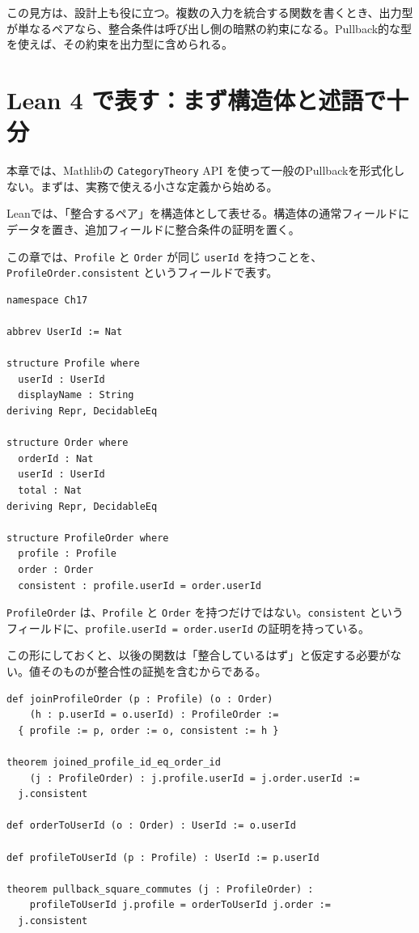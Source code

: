 この見方は、設計上も役に立つ。複数の入力を統合する関数を書くとき、出力型が単なるペアなら、整合条件は呼び出し側の暗黙の約束になる。Pullback的な型を使えば、その約束を出力型に含められる。

\section{Lean 4 で表す：まず構造体と述語で十分}

本章では、Mathlibの \texttt{CategoryTheory} API を使って一般のPullbackを形式化しない。まずは、実務で使える小さな定義から始める。

\begin{leanbox}
Leanでは、「整合するペア」を構造体として表せる。構造体の通常フィールドにデータを置き、追加フィールドに整合条件の証明を置く。

この章では、\texttt{Profile} と \texttt{Order} が同じ \texttt{userId} を持つことを、\texttt{ProfileOrder.consistent} というフィールドで表す。
\end{leanbox}

\begin{listing}[htbp]
\begin{verbatim}
namespace Ch17

abbrev UserId := Nat

structure Profile where
  userId : UserId
  displayName : String
deriving Repr, DecidableEq

structure Order where
  orderId : Nat
  userId : UserId
  total : Nat
deriving Repr, DecidableEq

structure ProfileOrder where
  profile : Profile
  order : Order
  consistent : profile.userId = order.userId
\end{verbatim}
\caption{プロフィール、注文、整合するペア}
\label{lst:ch17-profile-order}
\end{listing}

\texttt{ProfileOrder} は、\texttt{Profile} と \texttt{Order} を持つだけではない。\texttt{consistent} というフィールドに、\texttt{profile.userId = order.userId} の証明を持っている。

この形にしておくと、以後の関数は「整合しているはず」と仮定する必要がない。値そのものが整合性の証拠を含むからである。

\begin{listing}[htbp]
\begin{verbatim}
def joinProfileOrder (p : Profile) (o : Order)
    (h : p.userId = o.userId) : ProfileOrder :=
  { profile := p, order := o, consistent := h }

theorem joined_profile_id_eq_order_id
    (j : ProfileOrder) : j.profile.userId = j.order.userId :=
  j.consistent

def orderToUserId (o : Order) : UserId := o.userId

def profileToUserId (p : Profile) : UserId := p.userId

theorem pullback_square_commutes (j : ProfileOrder) :
    profileToUserId j.profile = orderToUserId j.order :=
  j.consistent
\end{verbatim}
\caption{Pullbackの四角形を等式として読む}
\label{lst:ch17-pullback-square}
\end{listing}

